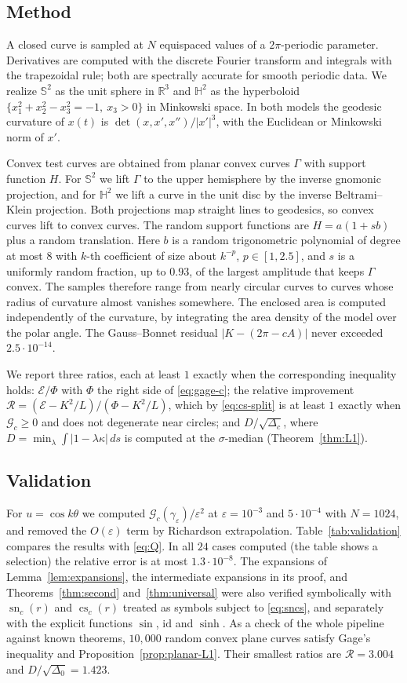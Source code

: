 \documentclass[11pt]{amsart}
\theoremstyle{definition}
\theoremstyle{remark}
\numberwithin{equation}{section}
\DeclareMathOperator{\sn}{sn}
\DeclareMathOperator{\cs}{cs}
\newcommand{\RR}{\mathbb{R}}
\newcommand{\HH}{\mathbb{H}}
\newcommand{\Sph}{\mathbb{S}}
\newcommand{\eps}{\varepsilon}
\newcommand{\E}{\mathcal{E}}
\newcommand{\G}{\mathcal{G}}
\begin{document}
\subsection{Method}
A closed curve is sampled at $N$ equispaced values of a $2\pi$-periodic parameter. Derivatives are computed with the discrete Fourier transform and integrals with the trapezoidal rule; both are spectrally accurate for smooth periodic data. We realize $\Sph^2$ as the unit sphere in $\RR^3$ and $\HH^2$ as the hyperboloid $\{x_1^2+x_2^2-x_3^2=-1,\ x_3>0\}$ in Minkowski space. In both models the geodesic curvature of $x(t)$ is $\det(x,x',x'')/|x'|^3$, with the Euclidean or Minkowski norm of $x'$.

Convex test curves are obtained from planar convex curves $\Gamma$ with support function $H$. For $\Sph^2$ we lift $\Gamma$ to the upper hemisphere by the inverse gnomonic projection, and for $\HH^2$ we lift a curve in the unit disc by the inverse Beltrami--Klein projection. Both projections map straight lines to geodesics, so convex curves lift to convex curves. The random support functions are $H=a(1+sb)$ plus a random translation. Here $b$ is a random trigonometric polynomial of degree at most $8$ with $k$-th coefficient of size about $k^{-p}$, $p\in[1,2.5]$, and $s$ is a uniformly random fraction, up to $0.93$, of the largest amplitude that keeps $\Gamma$ convex. The samples therefore range from nearly circular curves to curves whose radius of curvature almost vanishes somewhere. The enclosed area is computed independently of the curvature, by integrating the area density of the model over the polar angle. The Gauss--Bonnet residual $|K-(2\pi-cA)|$ never exceeded $2.5\cdot10^{-14}$.

We report three ratios, each at least $1$ exactly when the corresponding inequality holds: $\E/\Phi$ with $\Phi$ the right side of \eqref{eq:gage-c}; the relative improvement $\mathcal R=(\E-K^2/L)/(\Phi-K^2/L)$, which by \eqref{eq:cs-split} is at least $1$ exactly when $\G_c\ge0$ and does not degenerate near circles; and $D/\sqrt{\Delta_c}$, where $D=\min_\lambda\int|1-\lambda\kappa|\,ds$ is computed at the $\sigma$-median (Theorem~\ref{thm:L1}).

\subsection{Validation}
For $u=\cos k\theta$ we computed $\G_c(\gamma_\eps)/\eps^2$ at $\eps=10^{-3}$ and $5\cdot10^{-4}$ with $N=1024$, and removed the $O(\eps)$ term by Richardson extrapolation. Table~\ref{tab:validation} compares the results with \eqref{eq:Q}. In all $24$ cases computed (the table shows a selection) the relative error is at most $1.3\cdot10^{-8}$. The expansions of Lemma~\ref{lem:expansions}, the intermediate expansions in its proof, and Theorems~\ref{thm:second} and~\ref{thm:universal} were also verified symbolically with $\sn_c(r)$ and $\cs_c(r)$ treated as symbols subject to \eqref{eq:sncs}, and separately with the explicit functions $\sin$, $\mathrm{id}$ and $\sinh$. As a check of the whole pipeline against known theorems, $10{,}000$ random convex plane curves satisfy Gage's inequality and Proposition~\ref{prop:planar-L1}. Their smallest ratios are $\mathcal R=3.004$ and $D/\sqrt{\Delta_0}=1.423$.
\end{document}
